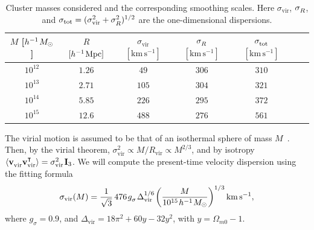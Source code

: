 \documentclass[fleqn,usenatbib]{mnras}
\def\Z#1{_{\lower1pt\hbox{$\scriptstyle#1$}}}
\def\Zu#1{^{\lower-1pt\hbox{$\scriptstyle#1$}}}
\def\ssp{\hspace{0.09em}}
\def\sp{\hspace{0.06em}}
\def\mrm#1{\mathrm{#1}}
\def\be{\begin{equation}}\def\ee{\end{equation}}
\def\OmO{\Omega_{m0}}
\def\T{\intercal}
\def\mat#1{{\mathbf{#1}}}
\def\v{\mathbf{v}}
\def\kin{{\rm k}}
\def\clu{{\rm c}}
\begin{document}
\begin{table}
\centering
\caption{Cluster masses considered and the corresponding smoothing scales. Here $\sigma_\mrm{vir}$, $\sigma\Z{R}$,
and $\sigma_\mrm{tot}=(\sigma_\mrm{vir}^2+\sigma\Z{R}^2)^{1/2}$
  are the one-dimensional dispersions.
  }
\setlength{\tabcolsep}{2pt}
\begin{tabular}{ccccccc}
\toprule
$M$ [$h^{-1}\ssp M_\odot$] & $R$ $[h^{-1}\ssp\mrm{Mpc}]$ & $\sigma_\mrm{vir}$ $[\mrm{km\,s^{-1}}]$ & $\sigma\Z{R}$ $[\mrm{km\,s^{-1}}]$ & $\sigma\Z{\mrm{tot}}$ $[\mrm{km\,s^{-1}}]$ \\ %
\midrule
$10^{12}$ & $1.26$ & $ 49$ & $306$ & $310$ \\ %
$10^{13}$ & $2.71$ & $105$  & $304$ & $321$ \\ %
$10^{14}$ & $5.85$ & $226$  & $295$ & $372$ \\ %
$10^{15}$ & $12.6$ & $488$  & $276$ & $561$ \\ %
\bottomrule
\end{tabular}
  \label{tab:smooth}
\end{table}


The virial motion is assumed to be that of an
isothermal sphere of mass $M$~\citep{2001MNRAS.322..901S}. Then, by the virial theorem,
$\sigma_\mrm{vir}^2\propto M/R_\mrm{vir}\propto M^{2/3}$, and by isotropy
$\langle\v_\mrm{vir}^{\phantom{\T}}\v_\mrm{vir}^\T\rangle=\sigma_\mrm{vir}^2\ssp\mat{I}_3$.
We will compute the present-time velocity dispersion using
the fitting formula~\citep{1998ApJ...495...80B}
\be
    \sigma_\mrm{vir}(M)
        =\frac{1}{\sqrt3}\, 476\ssp g\Z{\sigma}\ssp\Delta_\mrm{vir}\Zu{1/6}\ssp
         \bigg(\frac{M}{10^{15}\ssp h^{-1}\sp M_\odot}\bigg)^{1/3}\, \mrm{km\,s^{-1}},
\ee
where $g_\sigma=0.9$, and $\Delta_\mrm{vir}=18\pi^2+60y-32y^2$, with $y=\OmO-1$.%
\end{document}
